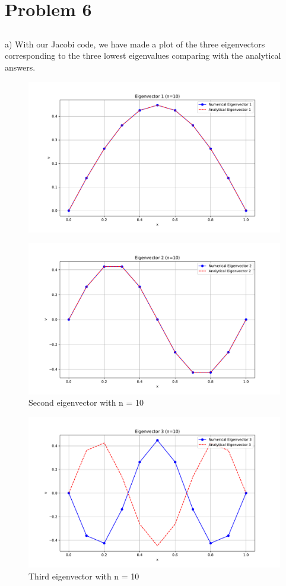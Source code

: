 \documentclass[english,notitlepage]{revtex4-1}
\begin{document}
\section{Problem 6}
\subsection*{}
a) With our Jacobi code, we have made a plot of the three eigenvectors corresponding to the three lowest eigenvalues comparing with the analytical answers.
\begin{figure} [H]
    \centering
    \includegraphics[width=0.75\linewidth]{problem6/eigenvector1_n10.pdf}
    \label{fig:enter-label}
\end{figure}
\begin{figure} [H]
    \centering
    \includegraphics[width=0.75\linewidth]{problem6/eigenvector2_n10.pdf}
    \caption{Second eigenvector with n = 10}
    \label{fig:enter-label}
\end{figure}
\begin{figure} [H]
    \centering
    \includegraphics[width=0.75\linewidth]{problem6/eigenvector3_n10.pdf}
    \caption{Third eigenvector with n = 10}
    \label{fig:enter-label}
\end{figure}
\end{document}
